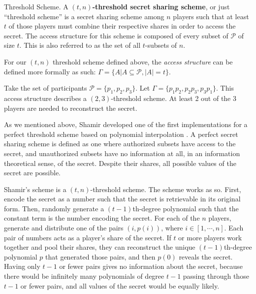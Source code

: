 \begin{definition}{Threshold Scheme.}
    \label{defn:threshold-scheme}
    A \textbf{$(t,n)$-threshold secret sharing scheme}, or just ``threshold scheme'' is a secret sharing scheme among $n$ players such that at least $t$ of those players must combine their respective shares in order to access the secret. The access structure for this scheme is composed of every subset of $\mathcal{P}$ of size $t$. This is also referred to as the set of all $t$-subsets of $n$.
\end{definition}

For our $(t,n)$ threshold scheme defined above, the \textit{access structure} can be defined more formally as such: $\Gamma = \{A | A \subseteq \mathcal{P} , |A| = t\}$.

\begin{example}
    Take the set of participants $\mathcal{P} = \{p_1,p_2,p_3\}$. Let $\Gamma = \{p_1p_2,p_2p_3,p_3p_1\}$. This access structure describes a $(2,3)$-threshold scheme. At least 2 out of the 3 players are needed to reconstruct the secret.
\end{example}

As we mentioned above, Shamir developed one of the first implementations for a perfect threshold scheme based on polynomial interpolation \cite{shamir_how_1979}. A perfect secret sharing scheme is defined as one where authorized subsets have access to the secret, and unauthorized subsets have no information at all, in an information theoretical sense, of the secret. Despite their shares, all possible values of the secret are possible.

Shamir's scheme is a $(t,n)$-threshold scheme. The scheme works as so. First, encode the secret as a number such that the secret is retrievable in its original form. Then, randomly generate a $(t-1)$th-degree polynomial such that the constant term is the number encoding the secret. For each of the $n$ players, generate and distribute one of the pairs $(i, p(i))$, where $i \in [1, \cdots, n]$. Each pair of numbers acts as a player's share of the secret. If $t$ or more players work together and pool their shares, they can reconstruct the unique $(t-1)$th-degree polynomial $p$ that generated those pairs, and then $p(0)$ reveals the secret. Having only $t-1$ or fewer pairs gives no information about the secret, because there would be infinitely many polynomials of degree $t-1$ passing through those $t-1$ or fewer pairs, and all values of the secret would be equally likely.


